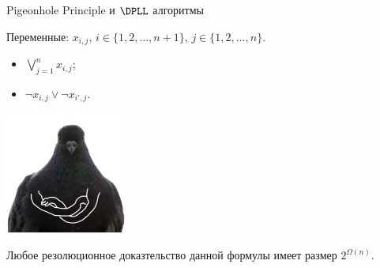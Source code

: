 \begin{frame}{Pigeonhole Principle и $\DPLL$ алгоритмы}

    Переменные: $x_{i, j}$, $i \in \{1, 2, \dots, n + 1\}$, $j \in \{1, 2, \dots, n\}$.
    \vspace{0.1cm}

    \pause
    \begin{itemize}
        \item $\bigvee\limits_{j = 1}^{n} x_{i, j}$;
        \item $\neg x_{i, j} \lor \neg x_{i', j}$.
    \end{itemize}

    \pause

    \vspace{0.2cm}
    \begin{minipage}{0.3\linewidth}
        \centering
        
    \end{minipage}
    \pause
    \begin{minipage}{0.68\linewidth}
        \centering
        \includegraphics[width = 0.3\textwidth]{pics/pigeon3.png}
        \pause
        \begin{theorem}[Haken 85]
            Любое резолюционное доказтельство данной формулы имеет размер $2^{\Omega(n)}$.
        \end{theorem}
    \end{minipage}
    
\end{frame}
